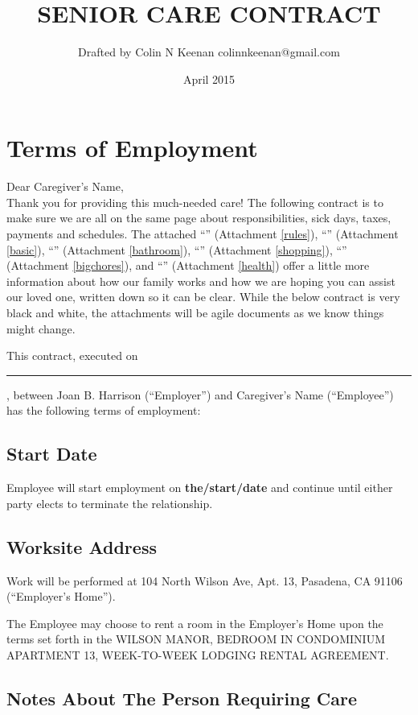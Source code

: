 \documentclass[]{article}
\newcommand{\mytitle}{SENIOR CARE CONTRACT}
\newcommand{\agreementtitle}{WILSON MANOR, BEDROOM IN CONDOMINIUM APARTMENT 13, WEEK-TO-WEEK LODGING RENTAL AGREEMENT}
\newcommand{\startdate}{the/start/date}
\newcommand{\datefillin}{\hspace{0.2cm}\rule{3cm}{.1pt}}
\newcommand{\lname}{Caregiver's Name}
\newcommand{\mom}{Joan B. Harrison}
\begin{document}
\title{\mytitle{}}
\author{Drafted by Colin N Keenan colinnkeenan@gmail.com}
\date{April 2015}
\maketitle
\thispagestyle{fancy}

\noindent \hrulefill
\section*{Terms of Employment}
Dear \lname{},\\

Thank you for providing this much-needed care! The following contract is to make sure we are all on the same page about responsibilities, sick days, taxes, payments and schedules. The attached ``'' (Attachment \ref{rules}), ``\basic{}'' (Attachment \ref{basic}), ``\bathroom{}'' (Attachment \ref{bathroom}), ``\shopping{}'' (Attachment \ref{shopping}), ``\bigchores{}'' (Attachment \ref{bigchores}), and ``\health{}'' (Attachment \ref{health}) offer a little more information about how our family works and how we are hoping you can assist our loved one, written down so it can be clear. While the below contract is very black and white, the attachments will be agile documents as we know things might change.

This contract, executed on \datefillin{}, between \mom{} (``Employer'') and \lname{} (``Employee'') has the following terms of employment:

\subsection*{Start Date}

Employee will start employment on \textbf{\startdate{}} and continue until either party elects to terminate the relationship.

\subsection*{Worksite Address}

Work will be performed at 104 North Wilson Ave, Apt. 13, Pasadena, CA 91106 (``Employer's Home'').

The Employee may choose to rent a room in the Employer's Home upon the terms set forth in the \agreementtitle{}.

\subsection*{Notes About The Person Requiring Care}
\end{document}
